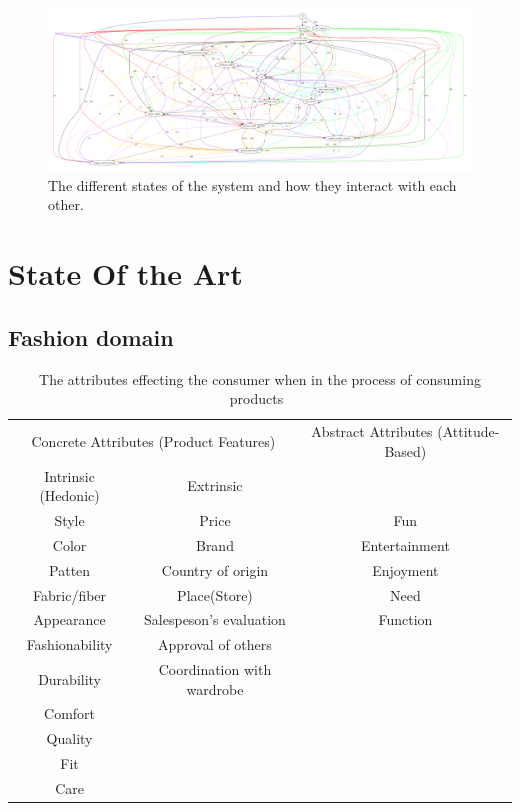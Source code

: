     \begin{figure}[H]
        \includegraphics[width=5in]{image/statesInteractionFalse-gvfile.pdf}
        \centering
        \caption[States in session and how they interact]{The different states of the system and how they interact with each other.}
        \label{figure:statesInteractions}
    \end{figure}

\chapter{State Of the Art}
\label{app:sota}

\section{Fashion domain}

\begin{table}[H]
    \centering
    \begin{tabular}{ccc}
    \toprule
      \multicolumn{2}{c}{Concrete Attributes (Product Features)} & Abstract Attributes (Attitude-Based) \\
      \cmidrule(r{1em}){1-2}
      \multicolumn{1}{c}{Intrinsic (Hedonic)} & \multicolumn{1}{c}{Extrinsic} 				 	& \\ \midrule
      Style 				& Price						 	& Fun \\
      Color				& Brand 					 	& Entertainment \\
      Patten 				& Country of origin			 	& Enjoyment\\
      Fabric/fiber 		& Place(Store) 				 	& Need \\
      Appearance	   	 	& Salespeson's evaluation	 	&  Function\\
      Fashionability  	& Approval of others 		 	&\\
      Durability			& Coordination with wardrobe 	&\\
      Comfort				&								& \\
      Quality				&								& \\
      Fit					&								& \\
      Care 				&								& \\
    \bottomrule
    \end{tabular}
    \caption[Consumers' Purchase Decisions]{The attributes effecting the consumer when in the process of consuming products~\cite{dutton2006}}
    \label{table:ConsumersPurchaseDec}
\end{table}

